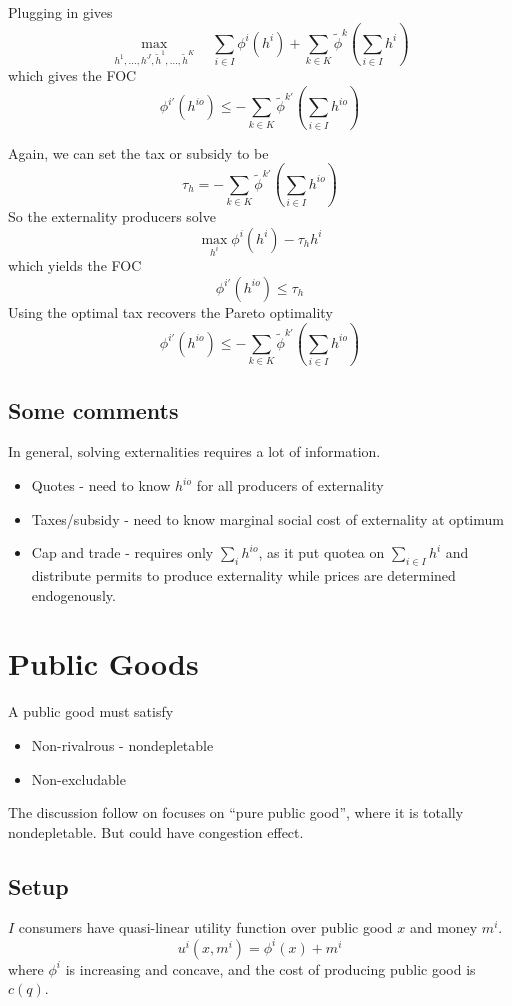 \documentclass[twocolumn, fleqn]{article}
\begin{document}
		 Plugging in gives
		 \[\max_{h^1, \dots, h^J, \tilde{h}^1, \dots, \tilde{h}^K} \quad \sum_{i \in I} \phi^i(h^i) + \sum_{k \in K} \tilde{\phi}^k (\sum_{i \in I} h^i)\]
		 which gives the FOC
		 \[\phi^{i\prime}(h^{io})\leq - \sum_{k\in K} \tilde{\phi}^{k \prime} \left(\sum_{i \in I} h^{io}\right)\]
		 
		 Again, we can set the tax or subsidy to be
		 \[ \tau_h = - \sum_{k\in K} \tilde{\phi}^{k \prime} \left(\sum_{i \in I} h^{io}\right)\]
		 So the externality producers solve
		 \[ \max_{h^i} \phi^i (h^i) - \tau_h h^i\]
		 which yields the FOC
		 \[\phi^{i \prime} (h^{io}) \leq \tau_h\]
		 Using the optimal tax recovers the Pareto optimality
		 \[\phi^{i\prime}(h^{io})\leq - \sum_{k\in K} \tilde{\phi}^{k \prime} \left(\sum_{i \in I} h^{io}\right)\]
		 
		 \subsection{Some comments}
		 In general, solving externalities requires a lot of information.
		 \begin{itemize}
		 	\item Quotes - need to know $h^{io}$ for all producers of externality
		 	\item Taxes/subsidy - need to know marginal social cost of externality at optimum
		 	\item Cap and trade - requires only $\sum_i h^{io}$, as it put quotea on $\sum_{i\in I} h^i$ and distribute permits to produce externality while prices are determined endogenously.
		 \end{itemize}
		
		
		
		
		
		\section{Public Goods}	
		
		A public good must satisfy 
		\begin{itemize}
			\item Non-rivalrous - nondepletable 
			\item Non-excludable
		\end{itemize}	
		The discussion follow on focuses on ``pure public good'', where it is totally nondepletable. But could have congestion effect.
		
		\subsection{Setup}
		$I$ consumers have quasi-linear utility function over public good $x$ and money $m^i$.
		\[ u^i(x, m^i)= \phi^i(x) +m^i\]
		where $\phi^i$ is increasing and concave, and the cost of producing public good is  \(c(q) \).
		
\end{document}
